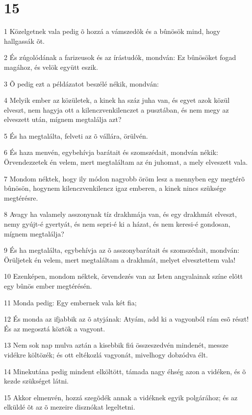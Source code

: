 \chapter{15}

\par 1 Közelgetnek vala pedig õ hozzá a vámszedõk és a bûnösök mind, hogy hallgassák õt.
\par 2 És zúgolódának a farizeusok és az írástudók, mondván: Ez bûnösöket fogad magához, és velök együtt eszik.
\par 3 Õ pedig ezt a példázatot beszélé nékik, mondván:
\par 4 Melyik ember az közületek, a kinek ha száz juha van, és egyet azok közül elveszt, nem hagyja ott a kilenczvenkilenczet a pusztában, és nem megy az elveszett után, mígnem megtalálja  azt?
\par 5 És ha megtalálta, felveti az õ vállára, örülvén.
\par 6 És haza menvén, egybehívja barátait és szomszédait, mondván nékik: Örvendezzetek én velem, mert megtaláltam az én juhomat, a mely elveszett vala.
\par 7 Mondom néktek, hogy ily módon nagyobb öröm lesz a mennyben egy megtérõ bûnösön, hogynem kilenczvenkilencz igaz emberen, a kinek nincs szüksége megtérésre.
\par 8 Avagy ha valamely asszonynak tíz drakhmája van, és egy drakhmát elveszt, nemy gyújt-é gyertyát, és nem sepri-é ki a házat, és nem keresi-é gondosan, mígnem megtalálja?
\par 9 És ha megtalálta, egybehívja az õ asszonybarátait és szomszédait, mondván: Örüljetek én velem, mert megtaláltam a drakhmát, melyet elvesztettem vala!
\par 10 Ezenképen, mondom néktek, örvendezés van az Isten angyalainak színe elõtt egy bûnös ember megtérésén.
\par 11 Monda pedig: Egy embernek vala két fia;
\par 12 És monda az ifjabbik az õ atyjának: Atyám, add ki a vagyonból rám esõ részt! És az megosztá köztök a vagyont.
\par 13 Nem sok nap mulva aztán a kisebbik fiú összeszedvén mindenét, messze vidékre költözék; és ott eltékozlá vagyonát, mivelhogy dobzódva élt.
\par 14 Minekutána pedig mindent elköltött, támada nagy éhség azon a vidéken, és õ kezde szükséget látni.
\par 15 Akkor elmenvén, hozzá szegõdék annak a vidéknek egyik polgárához; és az elküldé õt az õ mezeire disznókat legeltetni.

